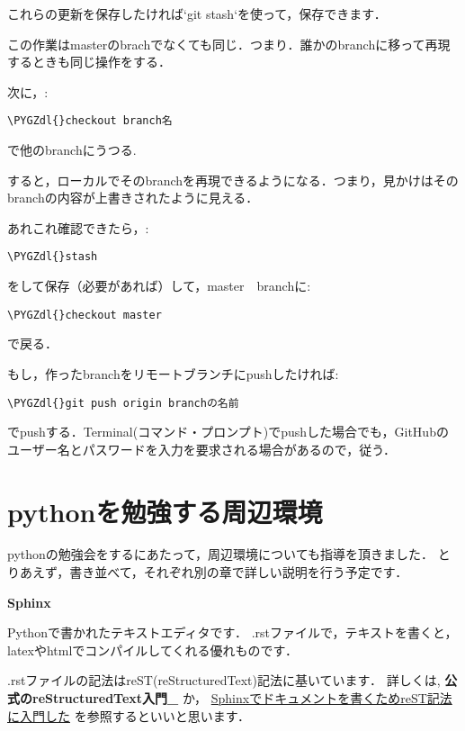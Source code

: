 \documentclass[letterpaper,10pt,english]{sphinxmanual}
\def\PYGZdl{\char`\$}
\begin{document}
これらの更新を保存したければ{}`git stash{}`を使って，保存できます．

この作業はmasterのbrachでなくても同じ．つまり．誰かのbranchに移って再現するときも同じ操作をする．

次に，:

\begin{Verbatim}[commandchars=\\\{\}]
\PYGZdl{}checkout branch名
\end{Verbatim}

で他のbranchにうつる.

すると，ローカルでそのbranchを再現できるようになる．つまり，見かけはそのbranchの内容が上書きされたように見える．

あれこれ確認できたら，:

\begin{Verbatim}[commandchars=\\\{\}]
\PYGZdl{}stash
\end{Verbatim}

をして保存（必要があれば）して，master　branchに:

\begin{Verbatim}[commandchars=\\\{\}]
\PYGZdl{}checkout master
\end{Verbatim}

で戻る．

もし，作ったbranchをリモートブランチにpushしたければ:

\begin{Verbatim}[commandchars=\\\{\}]
\PYGZdl{}git push origin branchの名前
\end{Verbatim}

でpushする．Terminal(コマンド・プロンプト)でpushした場合でも，GitHubのユーザー名とパスワードを入力を要求される場合があるので，従う．


\chapter{pythonを勉強する周辺環境}
\label{chap1/sec2:python}\label{chap1/sec2::doc}
pythonの勉強会をするにあたって，周辺環境についても指導を頂きました．
とりあえず，書き並べて，それぞれ別の章で詳しい説明を行う予定です．

\textbf{Sphinx}

Pythonで書かれたテキストエディタです．
.rstファイルで，テキストを書くと，latexやhtmlでコンパイルしてくれる優れものです．

.rstファイルの記法はreST(reStructuredText)記法に基いています．
詳しくは, {\color{red}\bfseries{}公式のreStructuredText入門\_} か， \href{http://d.hatena.ne.jp/kk\_Ataka/20111202/1322839748}{Sphinxでドキュメントを書くためreST記法に入門した} を参照するといいと思います．
\begin{quote}
\end{quote}
\end{document}
